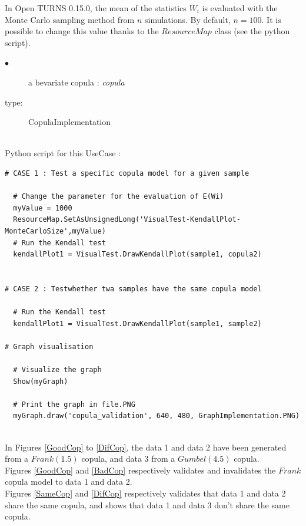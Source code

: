In Open TURNS 0.15.0, the mean of the statistics $W_i$ is evaluated with the Monte Carlo sampling method from $n$ simulations. By default, $n=100$. It is possible to change this value thanks to the $ResourceMap$ class (see the python script).


{
  \begin{description}
  \item[$\bullet$] a bevariate copula : {\itshape copula}
  \item[type:] CopulaImplementation
  \end{description}
}

\textspace\\
Python script for this UseCase :

\begin{lstlisting}
# CASE 1 : Test a specific copula model for a given sample

  # Change the parameter for the evaluation of E(Wi)
  myValue = 1000
  ResourceMap.SetAsUnsignedLong('VisualTest-KendallPlot-MonteCarloSize',myValue)
  # Run the Kendall test
  kendallPlot1 = VisualTest.DrawKendallPlot(sample1, copula2)


# CASE 2 : Testwhether twa samples have the same copula model

  # Run the Kendall test
  kendallPlot1 = VisualTest.DrawKendallPlot(sample1, sample2)

# Graph visualisation

  # Visualize the graph
  Show(myGraph)

  # Print the graph in file.PNG
  myGraph.draw('copula_validation', 640, 480, GraphImplementation.PNG)
\end{lstlisting}
\textspace\\

In Figures  \ref{GoodCop} to \ref{DifCop}, the data 1 and data 2  have been generated from a $Frank(1.5)$ copula, and data 3 from a $Gumbel(4.5)$ copula.\\
Figures \ref{GoodCop} and \ref{BadCop} respectively validates and invalidates the $Frank$ copula model to data 1 and data 2.\\
Figures \ref{SameCop} and  \ref{DifCop} respectively validates that data 1 and data 2 share the same copula, and shows that data 1 and data 3 don't share the same copula.\\


